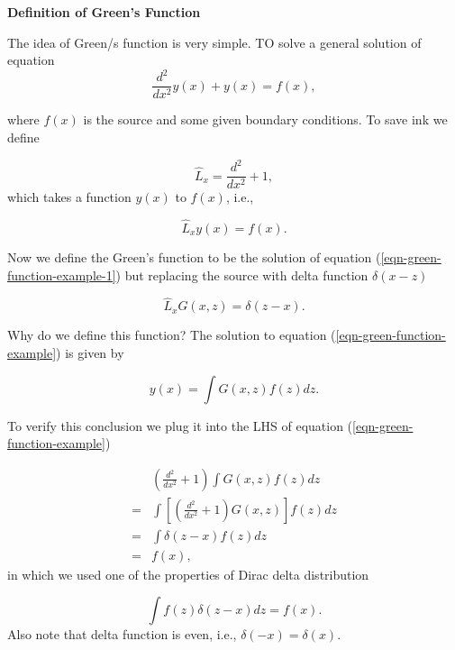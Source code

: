\begin{framed}

{\bf Definition of Green's Function}
\vspace{1em}

The idea of Green/s function is very simple. TO solve a general solution of equation
\begin{equation*}
    \frac{d^2}{d x^2} y(x) + y(x) = f(x), 
    \label{eqn-green-function-example}
\end{equation*}

where $f(x)$ is the source and some given boundary conditions. To save ink we define 

\begin{equation}
    \hat L_x = \frac{d^2}{dx^2} + 1,
\end{equation}
which takes a function $y(x)$ to $f(x)$, i.e.,

\begin{equation*}
    \hat L_x y(x) = f(x).
    \label{eqn-green-function-example-1}
\end{equation*}

Now we define the Green's function to be the solution of equation (\ref{eqn-green-function-example-1}) but replacing the source with delta function $\delta(x-z)$

\begin{equation*}
    \hat L_x G(x,z) = \delta(z-x).
\end{equation*}

Why do we define this function? The solution to equation (\ref{eqn-green-function-example}) is given by

\begin{equation}
    y(x) = \int G(x,z) f(z) dz.
\end{equation}

To verify this conclusion we plug it into the LHS of equation (\ref{eqn-green-function-example})

\begin{align*}
    & \left(\frac{d^2}{dx^2} +1 \right) \int G(x,z) f(z) dz \\
=& \int \left[ \left(\frac{d^2}{dx^2} +1 \right) G(x,z) \right] f(z) dz \\
=& \int \delta(z-x) f(z) dz \\
=& f(x),
\end{align*}
in which we used one of the properties of Dirac delta distribution

\begin{equation*}
    \int f(z) \delta(z-x) dz = f(x).
\end{equation*}
Also note that delta function is even, i.e., $\delta(-x) = \delta(x)$.


\end{framed}
